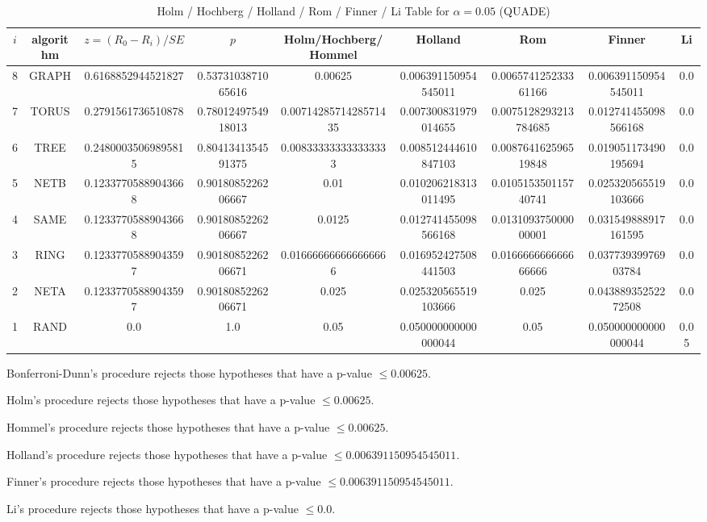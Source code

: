 \documentclass[a4paper,10pt]{article}
\begin{document}
\begin{landscape}
\newpage

\begin{table}[!htp]
\centering\scriptsize
\caption{Holm / Hochberg / Holland / Rom / Finner / Li Table for $\alpha=0.05$ (QUADE)}
\begin{tabular}{ccccccccc}
$i$&algorithm&$z=(R_0 - R_i)/SE$&$p$&Holm/Hochberg/Hommel&Holland&Rom&Finner&Li\\
\hline
8& GRAPH&0.6168852944521827&0.5373103871065616&0.00625&0.006391150954545011&0.006574125233361166&0.006391150954545011&0.0\\
7& TORUS&0.2791561736510878&0.7801249754918013&0.0071428571428571435&0.007300831979014655&0.0075128293213784685&0.012741455098566168&0.0\\
6& TREE&0.24800035069895815&0.8041341354591375&0.008333333333333333&0.008512444610847103&0.008764162596519848&0.019051173490195694&0.0\\
5& NETB&0.12337705889043668&0.9018085226206667&0.01&0.010206218313011495&0.010515350115740741&0.025320565519103666&0.0\\
4& SAME&0.12337705889043668&0.9018085226206667&0.0125&0.012741455098566168&0.013109375000000001&0.031549888917161595&0.0\\
3& RING&0.12337705889043597&0.9018085226206671&0.016666666666666666&0.016952427508441503&0.016666666666666666&0.03773939976903784&0.0\\
2& NETA&0.12337705889043597&0.9018085226206671&0.025&0.025320565519103666&0.025&0.04388935252272508&0.0\\
1& RAND&0.0&1.0&0.05&0.050000000000000044&0.05&0.050000000000000044&0.05\\
\hline
\end{tabular}
\end{table}
Bonferroni-Dunn's procedure rejects those hypotheses that have a p-value $\le0.00625$.


Holm's procedure rejects those hypotheses that have a p-value $\le0.00625$.


Hommel's procedure rejects those hypotheses that have a p-value $\le0.00625$.


Holland's procedure rejects those hypotheses that have a p-value $\le0.006391150954545011$.


Finner's procedure rejects those hypotheses that have a p-value $\le0.006391150954545011$.


Li's procedure rejects those hypotheses that have a p-value $\le0.0$.



\newpage


\end{landscape}
\end{document}
